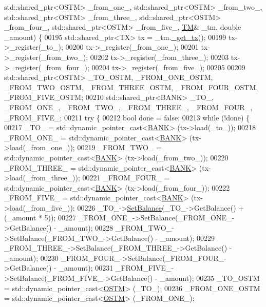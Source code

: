 \begin{DoxyCode}
      std::shared\_ptr<OSTM> \_from\_one\_, std::shared\_ptr<OSTM> \_from\_two\_, std::shared\_ptr<OSTM> \_from\_three\_, 
      std::shared\_ptr<OSTM> \_from\_four\_, std::shared\_ptr<OSTM> \_from\_five\_, \hyperlink{class_t_m}{TM}& \_tm, \textcolor{keywordtype}{double} \_amount) \{
00195     std::shared\_ptr<TX> tx = \_tm.\hyperlink{class_t_m_a41cb0226cc4080c931651b13f74a0075_a41cb0226cc4080c931651b13f74a0075}{\_get\_tx}();
00199     tx->\_register(\_to\_);
00200     tx->\_register(\_from\_one\_);
00201     tx->\_register(\_from\_two\_);
00202     tx->\_register(\_from\_three\_);
00203     tx->\_register(\_from\_four\_);
00204     tx->\_register(\_from\_five\_);
00205 
00209     std::shared\_ptr<OSTM> \_TO\_OSTM, \_FROM\_ONE\_OSTM, \_FROM\_TWO\_OSTM, \_FROM\_THREE\_OSTM, \_FROM\_FOUR\_OSTM, 
      \_FROM\_FIVE\_OSTM;
00210     std::shared\_ptr<BANK> \_TO\_, \_FROM\_ONE\_, \_FROM\_TWO\_, \_FROM\_THREE\_, \_FROM\_FOUR\_, \_FROM\_FIVE\_;
00211     \textcolor{keywordflow}{try} \{
00212         \textcolor{keywordtype}{bool} done = \textcolor{keyword}{false};
00213         \textcolor{keywordflow}{while} (!done) \{
00217             \_TO\_ = std::dynamic\_pointer\_cast<\hyperlink{class_b_a_n_k}{BANK}> (tx->load(\_to\_));
00218             \_FROM\_ONE\_ = std::dynamic\_pointer\_cast<\hyperlink{class_b_a_n_k}{BANK}> (tx->load(\_from\_one\_));
00219             \_FROM\_TWO\_ = std::dynamic\_pointer\_cast<\hyperlink{class_b_a_n_k}{BANK}> (tx->load(\_from\_two\_));
00220             \_FROM\_THREE\_ = std::dynamic\_pointer\_cast<\hyperlink{class_b_a_n_k}{BANK}> (tx->load(\_from\_three\_));
00221             \_FROM\_FOUR\_ = std::dynamic\_pointer\_cast<\hyperlink{class_b_a_n_k}{BANK}> (tx->load(\_from\_four\_));
00222             \_FROM\_FIVE\_ = std::dynamic\_pointer\_cast<\hyperlink{class_b_a_n_k}{BANK}> (tx->load(\_from\_five\_));
00226             \_TO\_->\hyperlink{class_b_a_n_k_ae3e45b407bf8ec7175662442ea24b7c0_ae3e45b407bf8ec7175662442ea24b7c0}{SetBalance}(\_TO\_->GetBalance() + (\_amount * 5));
00227             \_FROM\_ONE\_->SetBalance(\_FROM\_ONE\_->GetBalance() - \_amount);
00228             \_FROM\_TWO\_->SetBalance(\_FROM\_TWO\_->GetBalance() - \_amount);
00229             \_FROM\_THREE\_->SetBalance(\_FROM\_THREE\_->GetBalance() - \_amount);
00230             \_FROM\_FOUR\_->SetBalance(\_FROM\_FOUR\_->GetBalance() - \_amount);
00231             \_FROM\_FIVE\_->SetBalance(\_FROM\_FIVE\_->GetBalance() - \_amount);
00235             \_TO\_OSTM = std::dynamic\_pointer\_cast<\hyperlink{class_o_s_t_m}{OSTM}> (\_TO\_);
00236             \_FROM\_ONE\_OSTM = std::dynamic\_pointer\_cast<\hyperlink{class_o_s_t_m}{OSTM}> (\_FROM\_ONE\_);

\end{DoxyCode}
